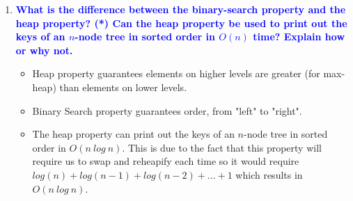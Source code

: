 \documentclass[11pt]{article}
\begin{document}
\begin{enumerate}
\item \textbf{\textcolor{blue}{What is the difference between the binary-search property and the heap property? (*) Can the heap property be used to print out the keys of an $n$-node tree in sorted order in $O(n)$ time? Explain how or why not.}}
    \begin{itemize}
    \item Heap property guarantees elements on higher levels are greater (for max-heap) than elements on lower levels.
    \item Binary Search property guarantees order, from "left" to "right".
    \item The heap property can print out the keys of an $n$-node tree in sorted order in $O(n\ log\ n)$. This is due to the fact that this property will require us to swap and reheapify each time so it would require $log(n) + log(n-1) + log(n-2) + ... + 1$ which results in $O(n\ log\ n)$.    
    \end{itemize}    
    

\end{enumerate}
\end{document}
